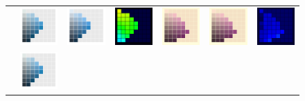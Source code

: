\begin{figure}[t]
{\begin{tabular}{ccccccc}
			&\includegraphics[width=.155\linewidth]{img/results_uplift_page29_originalFL7.png}
			&
			\includegraphics[width=.155\linewidth]{img/results_uplift_page29_sigmoidFL7.png}
			& 
			\includegraphics[width=.155\linewidth]{img/results_uplift_page29_diff_sigmoidFL7.png}
			&\quad
			\includegraphics[width=.155\linewidth]{img/results_uplift_page35_originalD50.png}
			&
			\includegraphics[width=.155\linewidth]{img/results_uplift_page35_sigmoidD50.png}
			&
			\includegraphics[width=.155\linewidth]{img/results_uplift_page35_diff_sigmoidD50.png}
			\\ \raisebox{0.5cm}[0pt][0pt]{\parbox[c][0pt][c]{0cm}{\hspace{-1.5em}\\[20pt]}\par}
			&
			\includegraphics[width=.155\linewidth]{img/results_uplift_page29_originalFL7.png}

\end{tabular}}
\end{figure}
